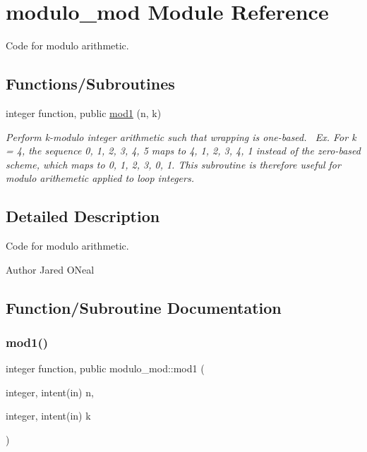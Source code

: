 \hypertarget{namespacemodulo__mod}{}\section{modulo\+\_\+mod Module Reference}
\label{namespacemodulo__mod}


Code for modulo arithmetic.  


\subsection*{Functions/\+Subroutines}
\begin{DoxyCompactItemize}
\item 
integer function, public \hyperlink{namespacemodulo__mod_a5fff359dad4bd0fd8b520730dffe056e}{mod1} (n, k)
\begin{DoxyCompactList}\small\item\em Perform k-\/modulo integer arithmetic such that wrapping is one-\/based.~\newline
 Ex. For k = 4, the sequence 0, 1, 2, 3, 4, 5 maps to 4, 1, 2, 3, 4, 1 instead of the zero-\/based scheme, which maps to 0, 1, 2, 3, 0, 1. This subroutine is therefore useful for modulo arithemetic applied to loop integers. \end{DoxyCompactList}\end{DoxyCompactItemize}


\subsection{Detailed Description}
Code for modulo arithmetic. 

\begin{DoxyAuthor}{Author}
Jared O\textquotesingle{}Neal 
\end{DoxyAuthor}


\subsection{Function/\+Subroutine Documentation}
\hypertarget{namespacemodulo__mod_a5fff359dad4bd0fd8b520730dffe056e}{}\label{namespacemodulo__mod_a5fff359dad4bd0fd8b520730dffe056e} 
\subsubsection{\texorpdfstring{mod1()}{mod1()}}
{\footnotesize\ttfamily integer function, public modulo\+\_\+mod\+::mod1 (\begin{DoxyParamCaption}\item[{integer, intent(in)}]{n,  }\item[{integer, intent(in)}]{k }\end{DoxyParamCaption})}



